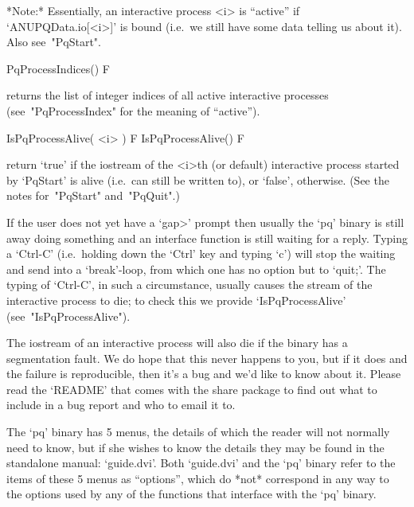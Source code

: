 *Note:*
Essentially,  an  interactive  {\ANUPQ}  process  <i>  is  ``active''  if
`ANUPQData.io[<i>]' is bound (i.e.~we still have  some  data  telling  us
about it). Also see~"PqStart".

\>PqProcessIndices() F

returns the list of integer indices of all  active  interactive  {\ANUPQ}
processes (see~"PqProcessIndex" for the meaning of ``active'').

\>IsPqProcessAlive( <i> ) F
\>IsPqProcessAlive() F

return  `true'  if  the  {\GAP}  iostream  of  the  <i>th  (or   default)
interactive {\ANUPQ} process started  by  `PqStart'  is  alive  (i.e.~can
still be written to), or `false', otherwise. (See the notes for~"PqStart"
and~"PqQuit".)

If the user does not yet have a  `gap>'  prompt  then  usually  the  `pq'
binary is still away doing something and an {\ANUPQ}  interface  function
is still waiting for a reply. Typing a `Ctrl-C'  (i.e.~holding  down  the
`Ctrl' key and typing `c') will stop the waiting and send {\GAP}  into  a
`break'-loop, from which one has no option but to `quit;'. The typing  of
`Ctrl-C', in such a  circumstance,  usually  causes  the  stream  of  the
interactive  {\ANUPQ}  process  to  die;  to  check   this   we   provide
`IsPqProcessAlive' (see~"IsPqProcessAlive").

The {\GAP} iostream of an interactive {\ANUPQ} process will also  die  if
the {\ANUPQ} binary has a segmentation fault. We do hope that this  never
happens to you, but if it does and the failure is reproducible, then it's
a bug and we'd like to know about it. Please read the `README' that comes
with the {\ANUPQ} share package to find out what  to  include  in  a  bug
report and who to email it to.


The `pq' binary has 5 menus, the details of which  the  reader  will  not
normally need to know, but if she wishes to know the details they may  be
found in the standalone manual: `guide.dvi'.  Both  `guide.dvi'  and  the
`pq' binary refer to the items of these 5 menus as ``options'', which  do
*not* correspond in any way to the options used  by  any  of  the  {\GAP}
functions that interface with the `pq' binary.

